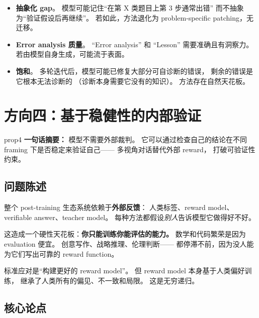 \documentclass[12pt,a4paper]{article}
\begin{document}
\begin{riskbox}
\begin{itemize}[leftmargin=1.5em]
  \item \textbf{抽象化 gap}。
    模型可能记住``在第 X 类题目上第 3 步通常出错''
    而不抽象为``验证假设后再继续''。
    若如此，方法退化为 problem-specific patching，无迁移。
  \item \textbf{Error analysis 质量}。
    ``Error analysis'' 和 ``Lesson'' 需要准确且有洞察力。
    若由模型自身生成，可能流于表面。
  \item \textbf{饱和}。
    多轮迭代后，模型可能已修复大部分可自诊断的错误，
    剩余的错误是它根本无法诊断的
    （诊断本身需要它没有的知识）。
    方法存在自然天花板。
\end{itemize}
\end{riskbox}


\newpage
\section{方向四：基于稳健性的内部验证}
\label{sec:prop4}

\begin{proposalbox}{prop4}
\textbf{一句话摘要：}
模型不需要外部裁判。
它可以通过检查自己的结论在不同 framing 下是否稳定来验证自己——
多视角对话替代外部 reward，
打破可验证性约束。
\end{proposalbox}

\subsection{问题陈述}

整个 post-training 生态系统依赖于\textbf{外部反馈}：
人类标签、reward model、verifiable answer、teacher model。
每种方法都假设\textit{别人}告诉模型它做得好不好。

这造成一个硬性天花板：\textbf{你只能训练你能评估的能力。}
数学和代码繁荣是因为 evaluation 便宜。
创意写作、战略推理、伦理判断——
都停滞不前，因为没人能为它们写出可靠的 reward function。

标准应对是``构建更好的 reward model''。
但 reward model 本身基于人类偏好训练，
继承了人类所有的偏见、不一致和局限。
这是无穷递归。

\subsection{核心论点}
\end{document}
